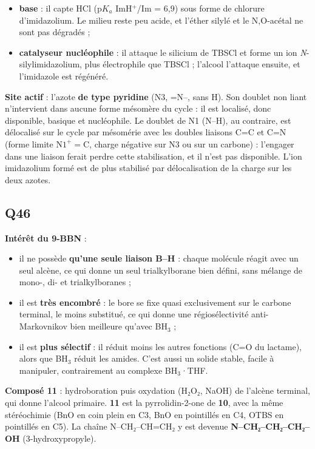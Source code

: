 \documentclass[11pt,a4paper]{article}
\providecommand{\tightlist}{\setlength{\itemsep}{0pt}\setlength{\parskip}{0pt}}
\begin{document}
\begin{itemize}
\tightlist
\item
  \textbf{base} : il capte HCl (p\(K_a\) ImH\(^+\)/Im = 6,9) sous forme de chlorure d'imidazolium. Le milieu reste peu acide, et l'éther silylé et le N,O-acétal ne sont pas dégradés ;
\item
  \textbf{catalyseur nucléophile} : il attaque le silicium de TBSCl et forme un ion \emph{N}-silylimidazolium, plus électrophile que TBSCl ; l'alcool l'attaque ensuite, et l'imidazole est régénéré.
\end{itemize}

\textbf{Site actif} : l'azote \textbf{de type pyridine} (N3, =N--, sans H). Son doublet non liant n'intervient dans aucune forme mésomère du cycle : il est localisé, donc disponible, basique et nucléophile. Le doublet de N1 (N--H), au contraire, est délocalisé sur le cycle par mésomérie avec les doubles liaisons C=C et C=N (forme limite \(\mathrm{N1^+{=}C}\), charge négative sur N3 ou sur un carbone) : l'engager dans une liaison ferait perdre cette stabilisation, et il n'est pas disponible. L'ion imidazolium formé est de plus stabilisé par délocalisation de la charge sur les deux azotes.

\hypertarget{q46}{%
\subsection{Q46}\label{q46}}

\textbf{Intérêt du 9-BBN} :

\begin{itemize}
\tightlist
\item
  il ne possède \textbf{qu'une seule liaison B--H} : chaque molécule réagit avec un seul alcène, ce qui donne un seul trialkylborane bien défini, sans mélange de mono-, di- et trialkylboranes ;
\item
  il est \textbf{très encombré} : le bore se fixe quasi exclusivement sur le carbone terminal, le moins substitué, ce qui donne une régiosélectivité anti-Markovnikov bien meilleure qu'avec BH\(_3\) ;
\item
  il est \textbf{plus sélectif} : il réduit moins les autres fonctions (C=O du lactame), alors que BH\(_3\) réduit les amides. C'est aussi un solide stable, facile à manipuler, contrairement au complexe BH\(_3\)·THF.
\end{itemize}

\textbf{Composé 11} : hydroboration puis oxydation (H₂O₂, NaOH) de l'alcène terminal, qui donne l'alcool primaire. \textbf{11} est la pyrrolidin-2-one de \textbf{10}, avec la même stéréochimie (BnO en coin plein en C3, BnO en pointillés en C4, OTBS en pointillés en C5). La chaîne N--CH₂--CH=CH₂ y est devenue \textbf{N--CH₂--CH₂--CH₂--OH} (3-hydroxypropyle).
\end{document}
